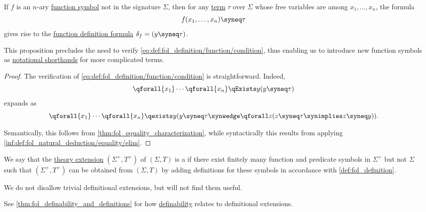 \begin{proposition}\label{thm:fol_definitional_extension_equation}
  If \( f \) is an \( n \)-ary \hyperref[def:fol_signature/function]{function symbol} not in the signature \( \Sigma \), then for any \hyperref[def:fol_term]{term} \( \tau \) over \( \Sigma \) whose free variables are among \( x_1, \ldots, x_n \), the formula
  \begin{equation}\label{eq:thm:fol_definitional_extension_equation}
    f(x_1, \ldots, x_n) \syneq \tau
  \end{equation}
  gives rise to the \hyperref[def:fol_definition/function]{function definition formula} \( \delta_f = (y \syneq \tau) \).
\end{proposition}
\begin{comments}
  \item This proposition precludes the need to verify \eqref{eq:def:fol_definition/function/condition}, thus enabling us to introduce new function symbols as \hyperref[con:syntactic_abbreviation]{notational shorthands} for more complicated terms.
\end{comments}
\begin{proof}
  The verification of \eqref{eq:def:fol_definition/function/condition} is straightforward. Indeed,
  \begin{equation*}
    \qforall {x_1} \cdots \qforall {x_n} \qExists y (y \syneq \tau)
  \end{equation*}
  expands as
  \begin{equation*}
    \qforall {x_1} \cdots \qforall {x_n} \qexists y (y \syneq \tau \synwedge \qforall z (z \syneq \tau \synimplies z \syneq y)).
  \end{equation*}

  Semantically, this follows from \cref{thm:fol_equality_characterization}, while syntactically this results from applying \ref{inf:def:fol_natural_deduction/equality/elim}.
\end{proof}

\begin{definition}\label{def:fol_definitional_extension}
  We say that the \hyperref[def:fol_theory/extension]{theory extension} \( (\Sigma^+, T^+) \) of \( (\Sigma, T) \) is a  if there exist finitely many function and predicate symbols in \( \Sigma^+ \) but not \( \Sigma \) such that \( (\Sigma^+, T^+) \) can be obtained from \( (\Sigma, T) \) by adding definitions for these symbols in accordance with \cref{def:fol_definition}.
\end{definition}
\begin{comments}
  \item We do not disallow trivial definitional extensions, but will not find them useful.
  \item See \cref{thm:fol_definability_and_definitions} for how \hyperref[def:fol_definability]{definability} relates to definitional extensions.
\end{comments}

